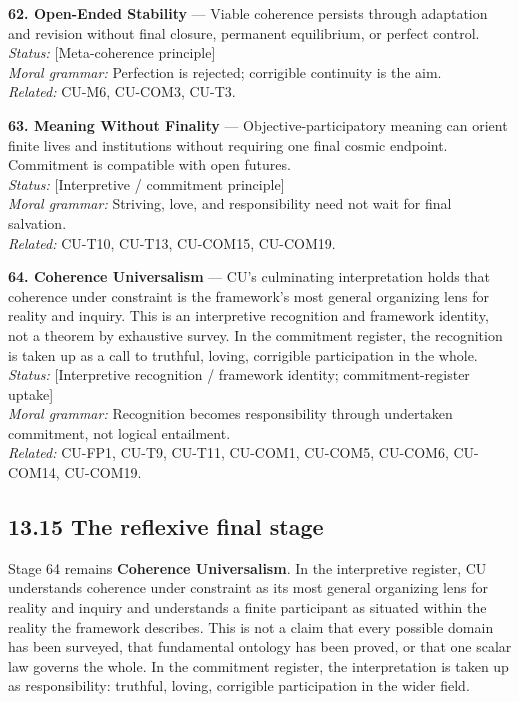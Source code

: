\documentclass[
  11pt,
]{article}
\begin{document}
\textbf{62. Open-Ended Stability} --- Viable coherence persists through
adaptation and revision without final closure, permanent equilibrium, or
perfect control.\\
\emph{Status:} {[}Meta-coherence principle{]}\\
\emph{Moral grammar:} Perfection is rejected; corrigible continuity is
the aim.\\
\emph{Related:} CU-M6, CU-COM3, CU-T3.

\textbf{63. Meaning Without Finality} --- Objective-participatory
meaning can orient finite lives and institutions without requiring one
final cosmic endpoint. Commitment is compatible with open futures.\\
\emph{Status:} {[}Interpretive / commitment principle{]}\\
\emph{Moral grammar:} Striving, love, and responsibility need not wait
for final salvation.\\
\emph{Related:} CU-T10, CU-T13, CU-COM15, CU-COM19.

\textbf{64. Coherence Universalism} --- CU's culminating interpretation
holds that coherence under constraint is the framework's most general
organizing lens for reality and inquiry. This is an interpretive
recognition and framework identity, not a theorem by exhaustive survey.
In the commitment register, the recognition is taken up as a call to
truthful, loving, corrigible participation in the whole.\\
\emph{Status:} {[}Interpretive recognition / framework identity;
commitment-register uptake{]}\\
\emph{Moral grammar:} Recognition becomes responsibility through
undertaken commitment, not logical entailment.\\
\emph{Related:} CU-FP1, CU-T9, CU-T11, CU-COM1, CU-COM5, CU-COM6,
CU-COM14, CU-COM19.

\subsection{13.15 The reflexive final
stage}\label{the-reflexive-final-stage}

Stage 64 remains \textbf{Coherence Universalism}. In the interpretive
register, CU understands coherence under constraint as its most general
organizing lens for reality and inquiry and understands a finite
participant as situated within the reality the framework describes. This
is not a claim that every possible domain has been surveyed, that
fundamental ontology has been proved, or that one scalar law governs the
whole. In the commitment register, the interpretation is taken up as
responsibility: truthful, loving, corrigible participation in the wider
field.
\end{document}
